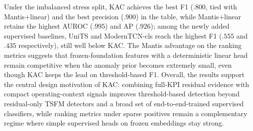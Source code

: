 \documentclass[conference]{IEEEtran}
\begin{document}
Under the imbalanced stress split, KAC achieves the best F1 ($.800$, tied with Mantis$+$linear) and the best precision ($.900$) in the table, while Mantis$+$linear retains the highest AUROC ($.995$) and AP ($.926$); among the newly added supervised baselines, UniTS and ModernTCN-cls reach the highest F1 ($.555$ and $.435$ respectively), still well below KAC. The Mantis advantage on the ranking metrics suggests that frozen-foundation features with a deterministic linear head remain competitive when the anomaly prior becomes extremely small, even though KAC keeps the lead on threshold-based F1. Overall, the results support the central design motivation of KAC: combining full-KPI residual evidence with compact operating-context signals improves threshold-based detection beyond residual-only TSFM detectors and a broad set of end-to-end-trained supervised classifiers, while ranking metrics under sparse positives remain a complementary regime where simple supervised heads on frozen embeddings stay strong.
\end{document}
